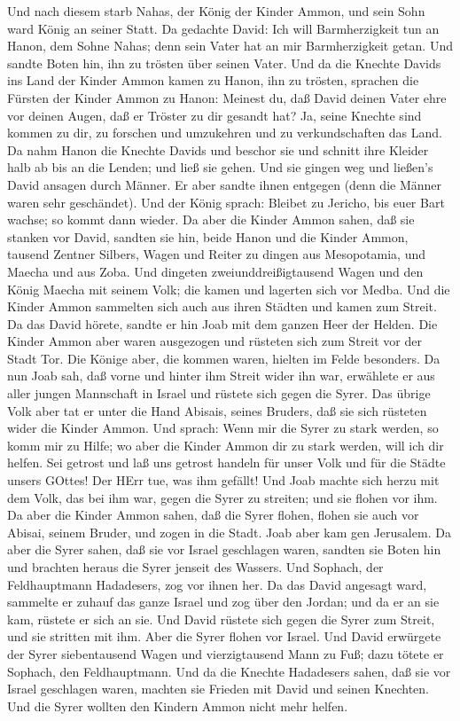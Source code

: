  Und nach diesem starb Nahas, der König der Kinder Ammon,
und sein Sohn ward König an seiner Statt.  Da gedachte
David: Ich will Barmherzigkeit tun an Hanon, dem Sohne Nahas; denn sein
Vater hat an mir Barmherzigkeit getan. Und sandte Boten hin, ihn zu
trösten über seinen Vater. Und da die Knechte Davids ins Land der Kinder
Ammon kamen zu Hanon, ihn zu trösten,  sprachen die Fürsten
der Kinder Ammon zu Hanon: Meinest du, daß David deinen Vater ehre vor
deinen Augen, daß er Tröster zu dir gesandt hat? Ja, seine Knechte sind
kommen zu dir, zu forschen und umzukehren und zu verkundschaften das
Land.  Da nahm Hanon die Knechte Davids und beschor sie und
schnitt ihre Kleider halb ab bis an die Lenden; und ließ sie gehen.
 Und sie gingen weg und ließen's David ansagen durch Männer.
Er aber sandte ihnen entgegen (denn die Männer waren sehr geschändet).
Und der König sprach: Bleibet zu Jericho, bis euer Bart wachse; so kommt
dann wieder.  Da aber die Kinder Ammon sahen, daß sie
stanken vor David, sandten sie hin, beide Hanon und die Kinder Ammon,
tausend Zentner Silbers, Wagen und Reiter zu dingen aus Mesopotamia, und
Maecha und aus Zoba.  Und dingeten zweiunddreißigtausend
Wagen und den König Maecha mit seinem Volk; die kamen und lagerten sich
vor Medba. Und die Kinder Ammon sammelten sich auch aus ihren Städten
und kamen zum Streit.  Da das David hörete, sandte er hin
Joab mit dem ganzen Heer der Helden.  Die Kinder Ammon aber
waren ausgezogen und rüsteten sich zum Streit vor der Stadt Tor. Die
Könige aber, die kommen waren, hielten im Felde besonders. 
Da nun Joab sah, daß vorne und hinter ihm Streit wider ihn war,
erwählete er aus aller jungen Mannschaft in Israel und rüstete sich
gegen die Syrer.  Das übrige Volk aber tat er unter die
Hand Abisais, seines Bruders, daß sie sich rüsteten wider die Kinder
Ammon.  Und sprach: Wenn mir die Syrer zu stark werden, so
komm mir zu Hilfe; wo aber die Kinder Ammon dir zu stark werden, will
ich dir helfen.  Sei getrost und laß uns getrost handeln
für unser Volk und für die Städte unsers GOttes! Der HErr tue, was ihm
gefällt!  Und Joab machte sich herzu mit dem Volk, das bei
ihm war, gegen die Syrer zu streiten; und sie flohen vor ihm.
 Da aber die Kinder Ammon sahen, daß die Syrer flohen,
flohen sie auch vor Abisai, seinem Bruder, und zogen in die Stadt. Joab
aber kam gen Jerusalem.  Da aber die Syrer sahen, daß sie
vor Israel geschlagen waren, sandten sie Boten hin und brachten heraus
die Syrer jenseit des Wassers. Und Sophach, der Feldhauptmann
Hadadesers, zog vor ihnen her.  Da das David angesagt ward,
sammelte er zuhauf das ganze Israel und zog über den Jordan; und da er
an sie kam, rüstete er sich an sie. Und David rüstete sich gegen die
Syrer zum Streit, und sie stritten mit ihm.  Aber die Syrer
flohen vor Israel. Und David erwürgete der Syrer siebentausend Wagen und
vierzigtausend Mann zu Fuß; dazu tötete er Sophach, den Feldhauptmann.
 Und da die Knechte Hadadesers sahen, daß sie vor Israel
geschlagen waren, machten sie Frieden mit David und seinen Knechten. Und
die Syrer wollten den Kindern Ammon nicht mehr helfen.

